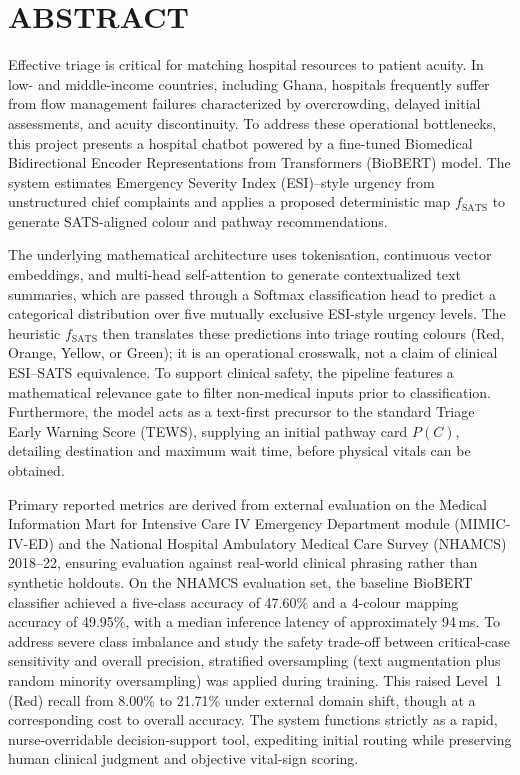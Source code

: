 \chapter*{ABSTRACT}

Effective triage is critical for matching hospital resources to patient acuity. In low- and middle-income countries, including Ghana, hospitals frequently suffer from flow management failures characterized by overcrowding, delayed initial assessments, and acuity discontinuity. To address these operational bottlenecks, this project presents a hospital chatbot powered by a fine-tuned Biomedical Bidirectional Encoder Representations from Transformers (BioBERT) model. The system estimates Emergency Severity Index (ESI)--style urgency from unstructured chief complaints and applies a proposed deterministic map \(f_{\mathrm{SATS}}\) to generate SATS-aligned colour and pathway recommendations.

The underlying mathematical architecture uses tokenisation, continuous vector embeddings, and multi-head self-attention to generate contextualized text summaries, which are passed through a Softmax classification head to predict a categorical distribution over five mutually exclusive ESI-style urgency levels. The heuristic \(f_{\mathrm{SATS}}\) then translates these predictions into triage routing colours (Red, Orange, Yellow, or Green); it is an operational crosswalk, not a claim of clinical ESI--SATS equivalence. To support clinical safety, the pipeline features a mathematical relevance gate to filter non-medical inputs prior to classification. Furthermore, the model acts as a text-first precursor to the standard Triage Early Warning Score (TEWS), supplying an initial pathway card \(P(C)\), detailing destination and maximum wait time, before physical vitals can be obtained.

Primary reported metrics are derived from external evaluation on the Medical Information Mart for Intensive Care IV Emergency Department module (MIMIC-IV-ED) and the National Hospital Ambulatory Medical Care Survey (NHAMCS) 2018--22, ensuring evaluation against real-world clinical phrasing rather than synthetic holdouts. On the NHAMCS evaluation set, the baseline BioBERT classifier achieved a five-class accuracy of 47.60\% and a 4-colour mapping accuracy of 49.95\%, with a median inference latency of approximately 94\,ms. To address severe class imbalance and study the safety trade-off between critical-case sensitivity and overall precision, stratified oversampling (text augmentation plus random minority oversampling) was applied during training. This raised Level~1 (Red) recall from 8.00\% to 21.71\% under external domain shift, though at a corresponding cost to overall accuracy. The system functions strictly as a rapid, nurse-overridable decision-support tool, expediting initial routing while preserving human clinical judgment and objective vital-sign scoring.
